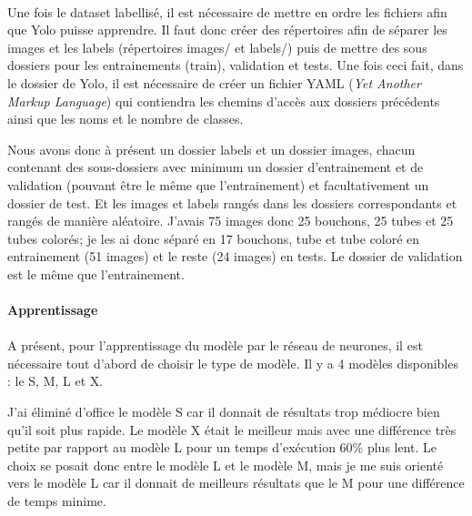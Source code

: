             \paragraph*{}
            Une fois le dataset labellisé, il est nécessaire de mettre en ordre les fichiers afin que Yolo puisse apprendre. Il faut donc créer des répertoires afin de séparer les images et les labels (répertoires images/ et labels/) puis de mettre des sous dossiers pour les entrainements (train), validation et tests. Une fois ceci fait, dans le dossier de Yolo, il est nécessaire de créer un fichier YAML (\textit{Yet Another Markup Language}) qui contiendra les chemins d'accès aux dossiers précédents ainsi que les noms et le nombre de classes.
            
            Nous avons donc à présent un dossier labels et un dossier images, chacun contenant des sous-dossiers avec minimum un dossier d'entrainement et de validation (pouvant être le même que l'entrainement) et facultativement un dossier de test. Et les images et labels rangés dans les dossiers correspondants et rangés de manière aléatoire. J'avais 75 images donc 25 bouchons, 25 tubes et 25 tubes colorés; je les ai donc séparé en 17 bouchons, tube et tube coloré en entrainement (51 images) et le reste (24 images) en tests. Le dossier de validation est le même que l'entrainement.

            
        \paragraph{Apprentissage}
            \paragraph*{}
            A présent, pour l'apprentissage du modèle par le réseau de neurones, il est nécessaire tout d'abord de choisir le type de modèle. Il y a 4 modèles disponibles : le S, M, L et X.
            
            J'ai éliminé d'office le modèle S car il donnait de résultats trop médiocre bien qu'il soit plus rapide.
            Le modèle X était le meilleur mais avec une différence très petite par rapport au modèle L pour un temps d'exécution 60\% plus lent. Le choix se posait donc entre le modèle L et le modèle M, mais je me suis orienté vers le modèle L car il donnait de meilleurs résultats que le M pour une différence de temps minime.
            
